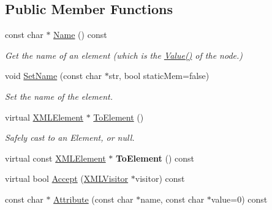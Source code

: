 \subsection*{Public Member Functions}
\begin{DoxyCompactItemize}
\item 
\mbox{\label{classtinyxml2_1_1XMLElement_a63e057fb5baee1dd29f323cb85907b35}} 
const char $\ast$ \hyperlink{classtinyxml2_1_1XMLElement_a63e057fb5baee1dd29f323cb85907b35}{Name} () const
\begin{DoxyCompactList}\small\item\em Get the name of an element (which is the \hyperlink{classtinyxml2_1_1XMLNode_a66344989a4b436155bcda72bd6b07b82}{Value()} of the node.) \end{DoxyCompactList}\item 
\mbox{\label{classtinyxml2_1_1XMLElement_a97712009a530d8cb8a63bf705f02b4f1}} 
void \hyperlink{classtinyxml2_1_1XMLElement_a97712009a530d8cb8a63bf705f02b4f1}{Set\+Name} (const char $\ast$str, bool static\+Mem=false)
\begin{DoxyCompactList}\small\item\em Set the name of the element. \end{DoxyCompactList}\item 
\mbox{\label{classtinyxml2_1_1XMLElement_ad9ff5c2dbc15df36cf664ce1b0ea0a5d}} 
virtual \hyperlink{classtinyxml2_1_1XMLElement}{X\+M\+L\+Element} $\ast$ \hyperlink{classtinyxml2_1_1XMLElement_ad9ff5c2dbc15df36cf664ce1b0ea0a5d}{To\+Element} ()
\begin{DoxyCompactList}\small\item\em Safely cast to an Element, or null. \end{DoxyCompactList}\item 
\mbox{\label{classtinyxml2_1_1XMLElement_afeb353047ab8532191709dcaef07337e}} 
virtual const \hyperlink{classtinyxml2_1_1XMLElement}{X\+M\+L\+Element} $\ast$ {\bfseries To\+Element} () const
\item 
virtual bool \hyperlink{classtinyxml2_1_1XMLElement_a9b2119831e8b85827d5d3e5076788e4a}{Accept} (\hyperlink{classtinyxml2_1_1XMLVisitor}{X\+M\+L\+Visitor} $\ast$visitor) const
\item 
const char $\ast$ \hyperlink{classtinyxml2_1_1XMLElement_a48cf4a315cfbac7d74cd0d5ff2c5df51}{Attribute} (const char $\ast$name, const char $\ast$value=0) const

\end{DoxyCompactItemize}
